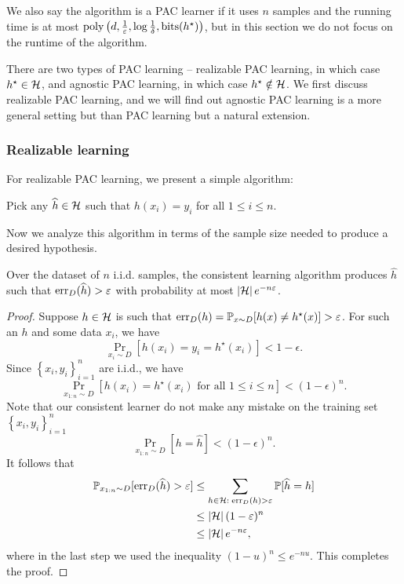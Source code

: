 \documentclass[a4paper]{article}
\begin{document}
We also say the algorithm is a PAC learner if it uses
$n$ samples and the running time is at most $\operatorname{poly}
\left( d, \frac{1}{\varepsilon}, \log \frac{1}{\delta},
\operatorname{bits}(h^\star) \right)$, but in this section we do not
focus on the runtime of the algorithm.

There are two types of PAC learning -- realizable PAC learning,
in which case $h^\star \in \mathcal{H}$, and agnostic PAC learning,
in which case $h^\star \notin \mathcal{H}$. We first discuss
realizable PAC learning, and we will find out agnostic PAC
learning is a more general setting but than PAC learning
but a natural extension.

\subsubsection{Realizable learning}

For realizable PAC learning, we present a simple algorithm:
\begin{algorithm}
Pick any $\widehat{h} \in \mathcal{H}$ such that $h(x_i) = y_i$
for all $1 \leq i \leq n$.
\end{algorithm}
Now we analyze this algorithm in terms of the sample size needed
to produce a desired hypothesis.

\begin{thm}
  Over the dataset of $n$ i.i.d. samples,
  the consistent learning algorithm produces $\hat{h}$ such
  that $\operatorname{err}_D(\widehat{h}) > \varepsilon$ with probability
  at most $\left\lvert \mathcal{H}\right\rvert e^{-n\varepsilon}$.
\end{thm}
\begin{proof}
  Suppose $h \in \mathcal{H}$ is such that
  $\operatorname{err}_D(h) = \mathbb{P}_{x \sim D} [h(x) \neq h^\star(x)] > \varepsilon$.
  For such an $h$ and some data $x_i$, we have
  \[
  \Pr_{x_i \sim D} [h(x_i) = y_i = h^\star(x_i)] < 1 - \epsilon.
  \]
  Since $\left\{ x_i, y_i \right\}_{i=1}^n$ are i.i.d., we have
  \[
  \Pr_{x_{1:n} \sim D}[h(x_i) = h^\star(x_i) \text{ for all
  $1 \leq i \leq n$}] < (1 - \epsilon)^n.
  \]
  Note that our consistent learner do not make any mistake
  on the training set $\left\{ x_i, y_i \right\}_{i=1}^n$
  \[
  \Pr_{x_{1 : n} \sim D} [h = \hat{h}] < (1 - \epsilon)^n.
  \]
  It follows that
  \[
  \begin{aligned}
    \mathbb{P}_{x_{1 : n} \sim D} [\operatorname{err}_D (\widehat{h}) > \varepsilon]
    & \leq \sum_{h \in \mathcal{H}: \; \operatorname{err}_D(h) > \varepsilon}
    \mathbb{P}[\widehat{h} = h]  \\
    & \leq \left\lvert \mathcal{H}\right\rvert (1 - \varepsilon)^n \\
    & \leq \left\lvert \mathcal{H}\right\rvert e^{-n\varepsilon},
  \end{aligned}
  \]
  where in the last step we used the inequality
  $(1 - u)^n \leq e^{-nu}$. This completes the proof.
\end{proof}
\end{document}
